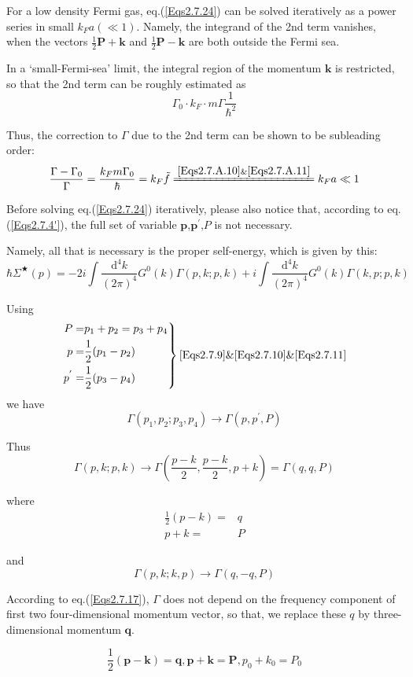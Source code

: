 For a low density Fermi gas, eq.(\ref{Eqs2.7.24}) can be solved iteratively as a power series in small $k_F a(\ll1)$. Namely, the integrand of the 2nd term vanishes, when the vectors $\frac{1}{2}\mathbf{P}+\mathbf{k}$ and $\frac{1}{2}\mathbf{P}-\mathbf{k}$ are both outside the Fermi sea.

In a `small-Fermi-sea' limit, the integral region of the momentum $\mathbf{k}$ is restricted, so that the 2nd term can be roughly estimated as
\[ \Gamma_0 \cdot k_F \cdot m \Gamma \frac{1}{\hbar^2} \]

Thus, the correction to $\Gamma$ due to the 2nd term can be shown to be subleading order:
\[ \frac{\Gamma-\Gamma_0}{\Gamma} = \frac{k_F m \Gamma_0}{\hbar} = k_F \tilde{f} \xlongequal{\ref{Eqs2.7.A.10} \& \ref{Eqs2.7.A.11}} k_F a \ll 1 \]

Before solving eq.(\ref{Eqs2.7.24}) iteratively, please also notice that, according to eq.(\ref{Eqs2.7.4'}), the full set of variable $\mathbf{p}$,$\mathbf{p}^{'}$,$P$ is not necessary.

Namely, all that is necessary is the proper self-energy, which is given by this:
\[ \hbar \Sigma^{\bigstar}(p) = -2 i \int \frac{\mathrm{d}^4 k}{(2\pi)^4} G^0(k)\Gamma(p,k;p,k) + i \int \frac{\mathrm{d}^4 k}{(2\pi)^4}G^0(k)\Gamma(k,p;p,k) \]

Using
\[ \left. \begin{aligned}
P =& p_1 + p_2 = p_3 + p_4\\
p =& \frac{1}{2}(p_1-p_2)\\
p^{'} =& \frac{1}{2}(p_3-p_4)
 \end{aligned} \right\} \ref{Eqs2.7.9} \& \ref{Eqs2.7.10} \& \ref{Eqs2.7.11} \]
we have
\[\Gamma(p_1,p_2;p_3,p_4) \rightarrow \Gamma(p,p^{'},P)\]

Thus
\[ \Gamma(p,k;p,k) \rightarrow \Gamma(\frac{p-k}{2},\frac{p-k}{2},p+k) = \Gamma(q,q,P) \]

where
\[ \begin{split} \frac{1}{2}(p-k) =& q\\ p+k =& P \end{split} \]

and
\[\Gamma(p,k;k,p) \rightarrow \Gamma(q,-q,P)\]

According to eq.(\ref{Eqs2.7.17}), $\Gamma$ does not depend on the frequency component of first two four-dimensional momentum vector, so that, we replace these $q$ by three-dimensional momentum $\mathbf{q}$.

\[\frac{1}{2}(\mathbf{p}-\mathbf{k})=\mathbf{q}, \mathbf{p}+\mathbf{k}=\mathbf{P},p_0+k_0=P_0
 \]


